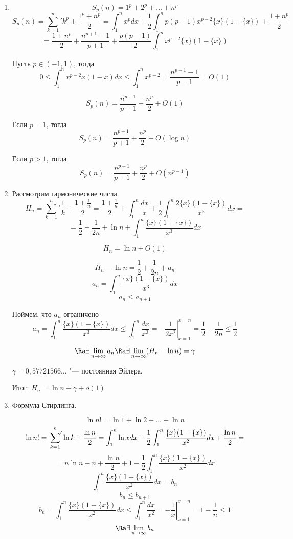 ﻿\begin{exmp}
\begin{enumerate}
\item 
$$S_p(n) = 1^p + 2^p + \ldots + n^p$$
$$S_p(n) = {\sum_{k = 1}^{n}}' k^p + \frac{1^p + n^p}{2} = 
\int_1^n x^p dx + \frac{1}{2}\int_1^n p(p - 1)x^{p - 2}\{x\}(1 - \{x\}) + \frac{1 + n^p}{2}$$
$$= \frac{1 + n^p}{2} + \frac{n^{p + 1} - 1}{p + 1} + \frac{p(p - 1)}{2}\int_1^n x^{p - 2}\{x\}(1 - \{x\})$$

Пусть $p \in (-1, 1)$, тогда
$$0 \le \int_1^n x^{p - 2}{x}(1 - {x})dx \le \int_1^{n}x^{p - 2} = 
\frac{n^{p - 1} - 1}{p - 1} = O(1)$$

$$S_p(n) = \frac{n^{p + 1}}{p + 1} + \frac{n^p}{2} + O(1)$$


Если $p = 1$, тогда
$$S_p(n) = \frac{n^{p + 1}}{p + 1} + \frac{n^p}{2} + O(\log n)$$

Если $p > 1$, тогда
$$S_p(n) = \frac{n^{p + 1}}{p + 1} + \frac{n^p}{2} + O(n^{p - 1})$$

\item
Рассмотрим гармонические числа.
$$H_n = {\sum_{k = 1}^n}' \frac{1}{k} + \frac{1 + \frac{1}{n}}{2} =
\frac{1 + \frac{1}{n}}{2} + \int_1^{n}\frac{dx}{x} + \frac{1}{2}\int_1^n\frac{2\{x\}(1 - \{x\})}{x^3}dx =$$
$$= \frac{1}{2} + \frac{1}{2n} + \ln n + \int_1^n\frac{\{x\}(1 - \{x\})}{x^3}dx$$

$$H_n = \ln n + O(1)$$

$$H_n - \ln n = \frac{1}{2} + \frac{1}{2n} + a_n$$
$$a_n = \int_1^n\frac{\{x\}(1 - \{x\})}{x^3}dx$$
$$a_n \le a_{n + 1}$$

Поймем, что $a_n$ ограничено
$$a_n = \int_1^n\frac{\{x\}(1 - \{x\})}{x^3}dx \le 
\int_1^{n}\frac{dx}{x^3} = \left. -\frac{1}{2x^2}\right |_{x = 1}^{x = n} = 
\frac{1}{2} - \frac{1}{2n} \le \frac{1}{2}$$

$$\Ra \exists \lim_{n \to \infty} a_n \Ra \exists \lim_{n \to \infty}(H_n - \ln n) = \gamma$$ 

$\gamma = 0,57721566\ldots$ "--- постоянная Эйлера.

Итог: $H_n = \ln n + \gamma + o(1)$
\item Формула Стирлинга.

$$\ln n! = \ln 1 + \ln 2 + \ldots + \ln n$$
$$\ln n! = \sideset{}{'}\sum_{k = 1}^{n} \ln k + \frac{\ln n}{2} =
\int_{1}^{n}\ln xdx - \frac{1}{2}\int_{1}^{n}\frac{\{x\}(1 - \{x\})}{x^2}dx + \frac{\ln n}{2} =$$
$$= n\ln n - n + \frac{\ln n}{2} + 1 - \frac{1}{2}\int_{1}^{n}\frac{\{x\}(1 - \{x\})}{x^2}dx $$
$$\int_{1}^{n}\frac{\{x\}(1 - \{x\})}{x^2}dx = b_n$$
$$b_n \le b_{n + 1}$$
$$b_n = \int_{1}^{n}\frac{\{x\}(1 - \{x\})}{x^2}dx  \le \int_1^{n}\frac{dx}{x^2} = \left. -\frac{1}{x} \right|_{x = 1}^{x = n} = 1 -\frac{1}{n} \le 1$$
$$\Ra \exists \lim_{n \to \infty} b_n$$


\end{enumerate}
\end{exmp}

